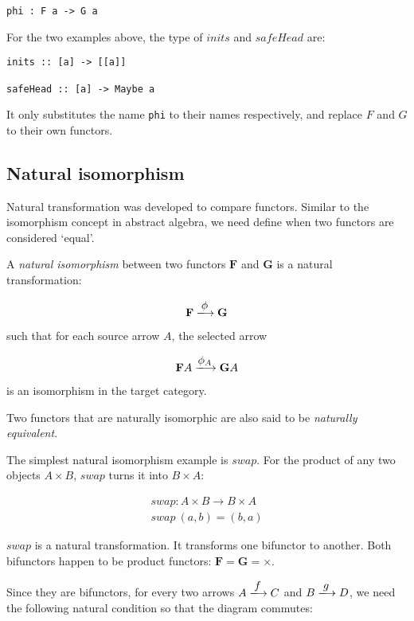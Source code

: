 \documentclass{article}
\begin{document}
\begin{lstlisting}
phi : F a -> G a
\end{lstlisting}

For the two examples above, the type of $inits$ and $safeHead$ are:

\begin{lstlisting}
inits :: [a] -> [[a]]

safeHead :: [a] -> Maybe a
\end{lstlisting}

It only substitutes the name \texttt{phi} to their names respectively, and replace $F$ and $G$ to their own functors.

\subsection{Natural isomorphism}

Natural transformation was developed to compare functors. Similar to the isomorphism concept in abstract algebra, we need define when two functors are considered `equal'.

\begin{definition}
\normalfont
A {\em natural isomorphism} between two functors $\mathbf{F}$ and $\mathbf{G}$ is a natural transformation:

\[
  \mathbf{F} \arrowto{\phi} \mathbf{G}
\]

such that for each source arrow $A$, the selected arrow

\[
  \mathbf{F}A \arrowto{\phi_A} \mathbf{G}A
\]

is an isomorphism in the target category.
\end{definition}

Two functors that are naturally isomorphic are also said to be {\em naturally equivalent}.

The simplest natural isomorphism example is $swap$. For the product of any two objects $A \times B$, $swap$ turns it into $B \times A$:

\[
\begin{array}{l}
swap : A \times B \to B \times A \\
swap\ (a, b) = (b, a)
\end{array}
\]

$swap$ is a natural transformation. It transforms one bifunctor to another. Both bifunctors happen to be product functors: $\mathbf{F} = \mathbf{G} = \times$.

Since they are bifunctors, for every two arrows $A \arrowto{f} C$ and $B \arrowto{g} D$, we need the following natural condition so that the diagram commutes:
\end{document}
